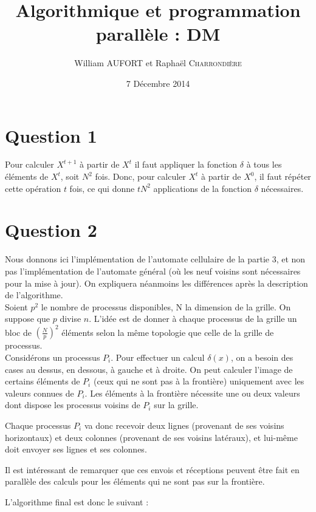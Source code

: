 \documentclass{article}
\title{Algorithmique et programmation parallèle : DM}
\author{William \textsc{AUFORT} et Raphaël \textsc{Charrondière}}
\date{7 Décembre 2014}
\newcommand{\X}[1]{{X}^{ #1 }}
\begin{document}
\maketitle

\section*{Question 1}

Pour calculer $\X{t+1}$ à partir de $\X{t}$ il faut appliquer la fonction $\delta$ à tous les éléments de $\X{t}$, soit $N^2$ fois.
Donc, pour calculer $\X{t}$ à partir de $\X{0}$, il faut répéter cette opération $t$ fois, ce qui donne $t N^2$ applications de la fonction $\delta$ nécessaires.

\section*{Question 2}

Nous donnons ici l'implémentation de l'automate cellulaire de la partie 3, et non pas l'implémentation de l'automate général (où les neuf voisins sont nécessaires pour la mise à jour). On expliquera néanmoins les différences après la description de l'algorithme. \\

Soient $p^2$ le nombre de processus disponibles, N la dimension de la grille. On suppose que $p$ divise $n$.
L'idée est de donner à chaque processus de la grille un bloc de $\left( \frac{N}{p} \right) ^2$ éléments selon la même topologie que celle de la grille de processus. \\

Considérons un processus $P_i$.
Pour effectuer un calcul $\delta(x)$, on a besoin des cases au dessus, en dessous, à gauche et à droite.
On peut calculer l'image de certains éléments de $P_i$ (ceux qui ne sont pas à la frontière) uniquement avec les valeurs connues de $P_i$. 
Les éléments à la frontière nécessite une ou deux valeurs dont dispose les processus voisins de $P_i$ sur la grille.


Chaque processus $P_i$ va donc recevoir deux lignes (provenant de ses voisins horizontaux) et deux colonnes (provenant de ses voisins latéraux), et lui-même doit envoyer ses lignes et ses colonnes.

Il est intéressant de remarquer que ces envois et réceptions peuvent être fait en parallèle des calculs pour les éléments qui ne sont pas sur la frontière.

L'algorithme final est donc le suivant :

	
\end{document}
